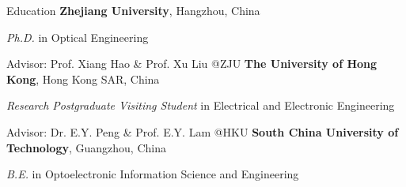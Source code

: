 \begin{rubric}{Education}
	\entry*[2018/09 -- 2023/12]%
	\textbf{Zhejiang University}, Hangzhou, China
	\par \textit{Ph.D.} in Optical Engineering
	\par Advisor: Prof. Xiang Hao \& Prof. Xu Liu @ZJU
\entry*[2022/12 -- 2023/04]%
	\textbf{The University of Hong Kong}, Hong Kong SAR, China
	\par \textit{Research Postgraduate Visiting Student} in Electrical and Electronic Engineering
	\par Advisor: Dr. E.Y. Peng \& Prof. E.Y. Lam @HKU
\entry*[2014/09 -- 2018/06]%
	\textbf{South China University of Technology}, Guangzhou, China
	\par \textit{B.E.} in Optoelectronic Information Science and Engineering
\end{rubric}